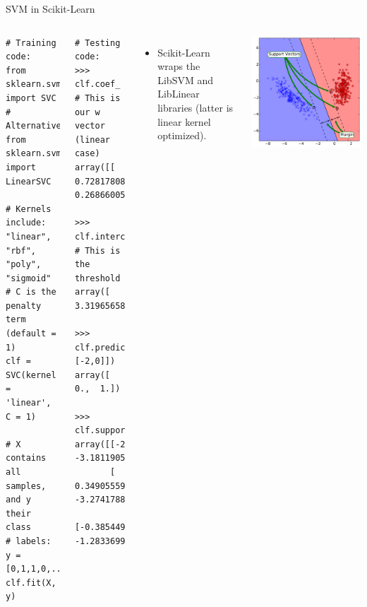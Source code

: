 \documentclass[10pt, aspectratio=169]{beamer} %
\begin{document}
\begin{frame}[fragile,allowframebreaks=0.8]
{SVM in Scikit-Learn}
\begin{columns}[onlytextwidth]
\begin{lstlisting}
# Training code:
from sklearn.svm import SVC
# Alternatively: from sklearn.svm import LinearSVC

# Kernels include: "linear", "rbf", "poly", "sigmoid"
# C is the penalty term (default = 1)
clf = SVC(kernel = 'linear', C = 1)

# X contains all samples, and y their class
# labels: y = [0,1,1,0,...]
clf.fit(X, y)
\end{lstlisting}
\begin{lstlisting}
# Testing code:
>>> clf.coef_ # This is our w vector (linear case)
array([[ 0.72817808,  0.26866005]])  

>>> clf.intercept_ # This is the threshold
array([ 3.31965658])

>>> clf.predict([[-4,-2], [-2,0]])
array([ 0.,  1.])

>>> clf.support_vectors_
array([[-2.43263229, -3.18119051],
       [ 0.34905559, -3.27417889],
       [-0.38544996, -1.28336992]])
\end{lstlisting}
\begin{itemize}
\item Scikit-Learn wraps the LibSVM and LibLinear libraries (latter is linear kernel optimized).
\end{itemize}
\centerline{\includegraphics[width=0.8\columnwidth]{SVM_boundary.pdf}}
\end{columns}
\end{frame}
\end{document}

